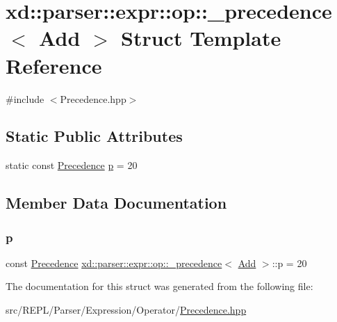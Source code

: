 \hypertarget{structxd_1_1parser_1_1expr_1_1op_1_1__precedence_3_01_add_01_4}{}\section{xd\+:\+:parser\+:\+:expr\+:\+:op\+:\+:\+\_\+precedence$<$ Add $>$ Struct Template Reference}
\label{structxd_1_1parser_1_1expr_1_1op_1_1__precedence_3_01_add_01_4}


{\ttfamily \#include $<$Precedence.\+hpp$>$}

\subsection*{Static Public Attributes}
\begin{DoxyCompactItemize}
\item 
static const \mbox{\hyperlink{namespacexd_1_1parser_1_1expr_1_1op_ae27abd4a02cd8125663cb2bacac299b2}{Precedence}} \mbox{\hyperlink{structxd_1_1parser_1_1expr_1_1op_1_1__precedence_3_01_add_01_4_ad740010120f03dc04023f422cc2ecfab}{p}} = 20
\end{DoxyCompactItemize}


\subsection{Member Data Documentation}
\mbox{\label{structxd_1_1parser_1_1expr_1_1op_1_1__precedence_3_01_add_01_4_ad740010120f03dc04023f422cc2ecfab}} 
\subsubsection{\texorpdfstring{p}{p}}
{\footnotesize\ttfamily const \mbox{\hyperlink{namespacexd_1_1parser_1_1expr_1_1op_ae27abd4a02cd8125663cb2bacac299b2}{Precedence}} \mbox{\hyperlink{structxd_1_1parser_1_1expr_1_1op_1_1__precedence}{xd\+::parser\+::expr\+::op\+::\+\_\+precedence}}$<$ \mbox{\hyperlink{structxd_1_1parser_1_1expr_1_1op_1_1_add}{Add}} $>$\+::p = 20\hspace{0.3cm}{\ttfamily [static]}}



The documentation for this struct was generated from the following file\+:\begin{DoxyCompactItemize}
\item 
src/\+R\+E\+P\+L/\+Parser/\+Expression/\+Operator/\mbox{\hyperlink{_precedence_8hpp}{Precedence.\+hpp}}\end{DoxyCompactItemize}
